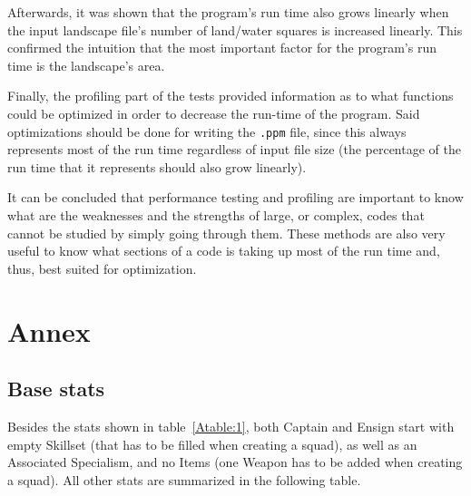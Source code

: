 \documentclass[12pt,a4paper]{article}
\begin{document}
Afterwards, it was shown that the program's run time also grows linearly when 
the input landscape file's number of land/water squares is increased linearly. 
This confirmed the intuition that the most important factor for the program's 
run time is the landscape's area. 

Finally, the profiling part of the tests provided information as to what 
functions could be optimized in order to decrease the run-time of the program. 
Said optimizations should be done for writing the \texttt{.ppm} file, since 
this always represents most of the run time regardless of input file size (the 
percentage of the run time that it represents should also grow linearly).

It can be concluded that performance testing and profiling are important to 
know what are the weaknesses and the strengths of large, or complex, codes that 
cannot be studied by simply going through them. These methods are also very 
useful to know what sections of a code is taking up most of the run time and, 
thus, best suited for optimization.

\newpage

\section{Annex}

\subsection{Base stats}

Besides the stats shown in table~\ref{Atable:1}, both Captain and Ensign start with empty Skillset (that has to be filled when creating a squad), as well as an Associated Specialism, and no Items (one Weapon has to be added when creating a squad). All other stats are summarized in the following table.
\end{document}

